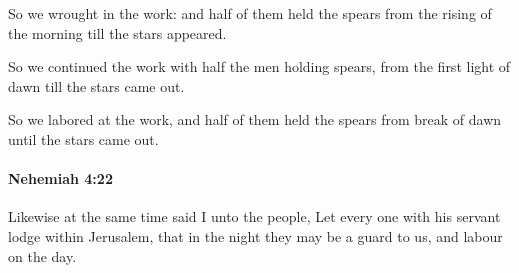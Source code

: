 			\begin{versebox}
					\item[BHS] 
					\item[LXX] 
					\item[ASV] So we wrought in the work: and half of them held the spears from the rising of the morning till the stars appeared.
					\item[NIV] So we continued the work with half the men holding spears, from the first light of dawn till the stars came out.
					\item[NRSV] So we labored at the work, and half of them held the spears from break of dawn until the stars came out.
			\end{versebox}

		\paragraph{Nehemiah 4:22} %
			\label{NEHEMIAH-4-22}

			Likewise at the same time said I unto the people, Let every one with his servant lodge within Jerusalem, that in the night they may be a guard to us, and labour on the day.

